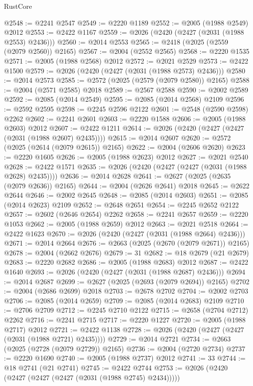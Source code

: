 \begin{lexlean}{RustCore}
\begin{coremodule}
@2548 := @2241 @2547
@2549 := @2220 @1189
@2552 := @2005 (@1988 @2549) @2012
@2553 := @2422 @1167
@2559 := @2026 (@2420 (@2427 (@2031 (@1988 @2553) @2436)))
@2560 := @2014 @2553
@2565 := @2418 (@2025 (@2559 (@2079 @2560)) @2165)
@2567 := @2004 (@2552 @2565)
@2568 := @2220 @1535
@2571 := @2005 (@1988 @2568) @2012
@2572 := @2021 @2529
@2573 := @2422 @1500
@2579 := @2026 (@2420 (@2427 (@2031 (@1988 @2573) @2436)))
@2580 := @2014 @2573
@2585 := @2572 (@2025 (@2579 (@2079 @2580)) @2165)
@2588 := @2004 (@2571 @2585) @2018
@2589 := @2567 @2588
@2590 := @2002 @2589
@2592 := @2085 (@2014 @2549)
@2595 := @2085 (@2014 @2568) @2109
@2596 := @2592 @2595
@2598 := @2245 @2596 @2122
@2601 := @2548 (@2590 @2598) @2262
@2602 := @2241 @2601
@2603 := @2220 @1588
@2606 := @2005 (@1988 @2603) @2012
@2607 := @2422 @1211
@2614 := @2026 (@2420 (@2427 (@2427 (@2031 (@1988 @2607) @2435))))
@2615 := @2014 @2607
@2620 := @2572 (@2025 (@2614 (@2079 @2615)) @2165)
@2622 := @2004 (@2606 @2620)
@2623 := @2220 @1605
@2626 := @2005 (@1988 @2623) @2012
@2627 := @2021 @2540
@2628 := @2422 @1571
@2635 := @2026 (@2420 (@2427 (@2427 (@2031 (@1988 @2628) @2435))))
@2636 := @2014 @2628
@2641 := @2627 (@2025 (@2635 (@2079 @2636)) @2165)
@2644 := @2004 (@2626 @2641) @2018
@2645 := @2622 @2644
@2646 := @2002 @2645
@2648 := @2085 (@2014 @2603)
@2651 := @2085 (@2014 @2623) @2109
@2652 := @2648 @2651
@2654 := @2245 @2652 @2122
@2657 := @2602 (@2646 @2654) @2262
@2658 := @2241 @2657
@2659 := @2220 @1053
@2662 := @2005 (@1988 @2659) @2012
@2663 := @2021 @2518
@2664 := @2422 @1623
@2670 := @2026 (@2420 (@2427 (@2031 (@1988 @2664) @2436)))
@2671 := @2014 @2664
@2676 := @2663 (@2025 (@2670 (@2079 @2671)) @2165)
@2678 := @2004 (@2662 @2676)
@2679 := 31
@2682 := @18 @2679 (@21 @2679)
@2683 := @2220 @2682
@2686 := @2005 (@1988 @2683) @2012
@2687 := @2422 @1640
@2693 := @2026 (@2420 (@2427 (@2031 (@1988 @2687) @2436)))
@2694 := @2014 @2687
@2699 := @2627 (@2025 (@2693 (@2079 @2694)) @2165)
@2702 := @2004 (@2686 @2699) @2018
@2703 := @2678 @2702
@2704 := @2002 @2703
@2706 := @2085 (@2014 @2659)
@2709 := @2085 (@2014 @2683) @2109
@2710 := @2706 @2709
@2712 := @2245 @2710 @2122
@2715 := @2658 (@2704 @2712) @2262
@2716 := @2241 @2715
@2717 := @2220 @1227
@2720 := @2005 (@1988 @2717) @2012
@2721 := @2422 @1138
@2728 := @2026 (@2420 (@2427 (@2427 (@2031 (@1988 @2721) @2435))))
@2729 := @2014 @2721
@2734 := @2663 (@2025 (@2728 (@2079 @2729)) @2165)
@2736 := @2004 (@2720 @2734)
@2737 := @2220 @1690
@2740 := @2005 (@1988 @2737) @2012
@2741 := 33
@2744 := @18 @2741 (@21 @2741)
@2745 := @2422 @2744
@2753 := @2026 (@2420 (@2427 (@2427 (@2427 (@2031 (@1988 @2745) @2434)))))

\end{coremodule}
\end{lexlean}
